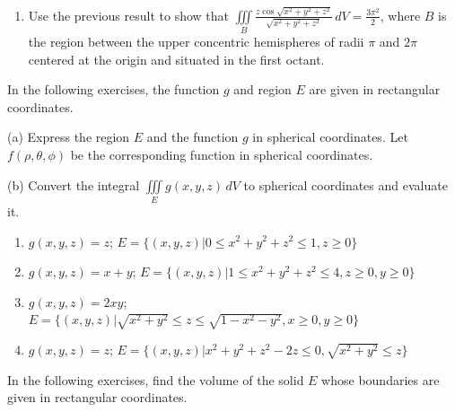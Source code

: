 \documentclass{exercises}
\begin{document}
\begin{enumerate}[resume]
\begin{enumerate}[label=(\alph*)]
  \item Use the previous result to show that $\underset{B}{\iiint}\frac{z\cos \sqrt{x^{2}+y^{2}+z^{2}}}{\sqrt{x^{2}+y^{2}+z^{2}}}\,dV=\frac{3\pi^{2}}{2}$, where $B$ is the region between the upper concentric hemispheres of radii $\pi$ and $2\pi$ centered at the origin and situated in the first octant.
\end{enumerate}
\end{enumerate}

In the following exercises, the function $g$ and region $E$ are given in rectangular coordinates.


(a) Express the region $E$ and the function $g$ in spherical coordinates. Let $f(\rho,\theta,\phi)$ be the corresponding function in spherical coordinates.


(b) Convert the integral $\underset{E}{\iiint}g(x,y,z)\,dV$ to spherical coordinates and evaluate it.

\begin{enumerate}[resume]
\item $g(x,y,z)=z$; $E=\{(x,y,z)|0\le x^{2}+y^{2}+z^{2}\le1,z\ge0\}$
\item $g(x,y,z)=x+y$; $E=\{(x,y,z)|1\le x^{2}+y^{2}+z^{2}\le4,z\ge0,y\ge0\}$
\item $g(x,y,z)=2xy$; $E=\{(x,y,z)|\sqrt{x^{2}+y^{2}}\le z\le \sqrt{1-x^{2}-y^{2}},x\ge0,y\ge0\}$
\item $g(x,y,z)=z$; $E=\{(x,y,z)|x^{2}+y^{2}+z^{2}-2z\le0,\sqrt{x^{2}+y^{2}}\le z\}$
\end{enumerate}

In the following exercises, find the volume of the solid $E$ whose boundaries are given in rectangular coordinates.
\end{document}
